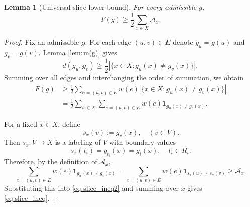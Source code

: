 \documentclass[11pt,oneside,letterpaper]{article}
\numberwithin{equation}{section}
\newtheorem{lemma}[theorem]{Lemma}
\theoremstyle{definition}
\theoremstyle{remark}
\begin{document}
\begin{lemma}[Universal slice lower bound]
  \label{lem:slice}
  For every admissible $g$,
  \begin{equation}
    \label{eq:slice_ineq}
    F(g) \ge \frac{1}{2} \sum_{x\in X} \mathcal{A}_x.
  \end{equation}
\end{lemma}
\begin{proof}
  Fix an admissible $g$. For each edge $(u,v)\in E$ denote $g_u=g(u)$ and $g_v=g(v)$. Lemma \ref{lem:m(g)} gives
  \begin{equation}
    d(g_u,g_v) \ge \frac{1}{2}|\{x\in X: g_u(x) \ne g_v(x)\}|,
  \end{equation}
  Summing over all edges and interchanging the order of summation, we obtain
  \begin{align}
    \label{eq:slice_ineq2}
    F(g) &\ge \frac{1}{2} \sum_{e=(u,v)\in E} w(e) |\{x\in X: g_u(x)\ne g_v(x)\}| \\
    &= \frac{1}{2}\sum_{x\in X}\sum_{e=(u,v)\in E} w(e) \mathbf{1}_{g_u(x)\ne g_v(x)}.
  \end{align}

  For a fixed $x\in X$, define
  \begin{equation}
    s_x(v) := g_v(x), \quad (v\in V).
  \end{equation}
  Then $s_x:V\to X$ is a labeling of $V$ with boundary values
  \begin{equation}
    s_x(t_i) = g_{t_i}(x) = g_i(x), \quad t_i\in R_i.
  \end{equation}
  Therefore, by the definition of $\mathcal{A}_x$,
  \begin{equation}
    \sum_{e=(u,v)\in E} w(e)\mathbf{1}_{g_u(x)\ne g_v(x)} = \sum_{e=(u,v)\in E} w(e)\mathbf{1}_{s_x(u)\ne s_x(v)} \ge \mathcal{A}_x.
  \end{equation}
  Substituting this into \eqref{eq:slice_ineq2} and summing over $x$ gives \eqref{eq:slice_ineq}.
\end{proof}
\end{document}
